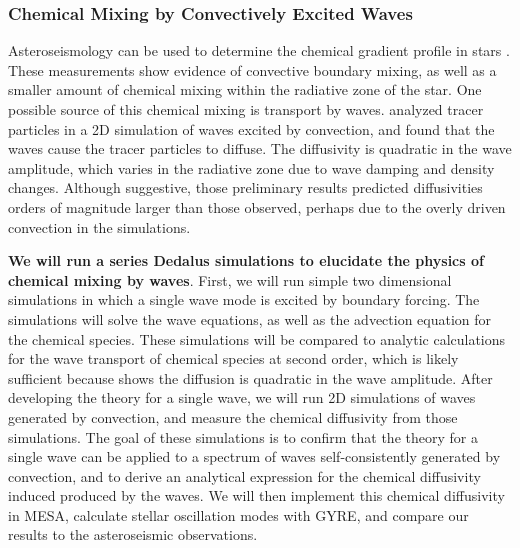\subsubsection{Chemical Mixing by Convectively Excited Waves}

Asteroseismology can be used to determine the chemical gradient profile in stars \citep{moravveji:15,moravveji:16,Ghasemi_2016}. These measurements show evidence of convective boundary mixing, as well as a smaller amount of chemical mixing within the radiative zone of the star. One possible source of this chemical mixing is transport by waves. \citet{Rogers2017} analyzed tracer particles in a 2D simulation of waves excited by convection, and found that the waves cause the tracer particles to diffuse. The diffusivity is quadratic in the wave amplitude, which varies in the radiative zone due to wave damping and density changes. Although suggestive, those preliminary results predicted diffusivities orders of magnitude larger than those observed, perhaps due to the overly driven convection in the simulations. 

\textbf{We will run a series Dedalus simulations to elucidate the physics of chemical mixing by waves}. First, we will run simple two dimensional simulations in which a single wave mode is excited by boundary forcing. The simulations will solve the wave equations, as well as the advection equation for the chemical species. These simulations will be compared to analytic calculations for the wave transport of chemical species at second order, which is likely sufficient because \citet{Rogers2017} shows the diffusion is quadratic in the wave amplitude. After developing the theory for a single wave, we will run 2D simulations of waves generated by convection, and measure the chemical diffusivity from those simulations. The goal of these simulations is to confirm that the theory for a single wave can be applied to a spectrum of waves self-consistently generated by convection, and to derive an analytical expression for the chemical diffusivity induced produced by the waves. We will then implement this chemical diffusivity in MESA, calculate stellar oscillation modes with GYRE, and compare our results to the asteroseismic observations.
